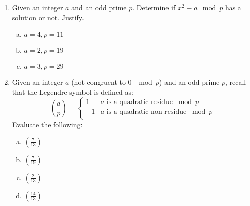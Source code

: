 \documentclass[12pt]{amsart}
\theoremstyle{plain}
\theoremstyle{definition}
\begin{document}
\begin{enumerate}[1.]
	\item Given an integer $a$ and an odd prime $p$.  Determine if $x^2 \equiv a \mod p$ has a solution or not.  Justify.
	\begin{enumerate}[a.]
		\item $a = 4, p = 11$
		\begin{framed}
		\vspace{1in}
		\end{framed}
		\item $a = 2, p = 19$
		\begin{framed}
		\vspace{1in}
		\end{framed}
		\item $a = 3, p = 29$
		\begin{framed}
		\vspace{1in}
		\end{framed}
	\end{enumerate}
	\item Given an integer $a$ (not congruent to 0 $\mod p$) and an odd prime $p$, recall that the Legendre symbol is defined as: 
	\[ \left( \frac{a}{p}\right) = \begin{cases} 
      1 & a \text{ is a quadratic residue } \bmod p \\
      -1 & a \text{ is a quadratic non-residue } \bmod p \\
   \end{cases}
	\]
	Evaluate the following:
	\begin{enumerate}[a.]
		\item $\left( \frac{7}{13} \right)$
		\begin{framed}
		\vspace{1.1in}
		\end{framed}
		\item $\left( \frac{7}{19} \right)$
		\begin{framed}
		\vspace{1.1in}
		\end{framed}
		\item $\left( \frac{2}{13} \right)$
		\begin{framed}
		\vspace{1.1in}
		\end{framed}
		\item $\left( \frac{14}{13} \right)$
		\begin{framed}
		\vspace{1.1in}
		\end{framed}

\end{enumerate}
\end{enumerate}
\end{document}
